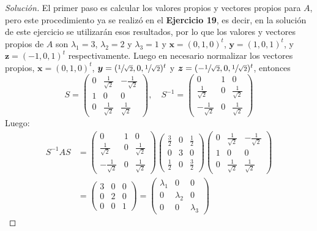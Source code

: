 \documentclass[12pt]{book}
\newenvironment{solucion}
  {\renewcommand\qedsymbol{$\square$}\begin{proof}[Solución]}
  {\end{proof}}
\begin{document}
\begin{solucion}
El primer paso es calcular los valores propios y vectores propios para $A$, pero este procedimiento ya se realizó en el \textbf{Ejercicio 19}, es decir, en la solución de este ejercicio se utilizarán esos resultados, por lo que los valores y vectores propios de $A$ son $\lambda_1=3$, $\lambda_2=2$ y $\lambda_3=1$ y $\bm{x}=(0,1,0)^t$, $\bm{y}=(1,0,1)^t$, y $\bm{z}=(-1,0,1)^t$ respectivamente. Luego en necesario normalizar los vectores propios, $\bm{x}=(0,1,0)^t$, $\bm{y}=(\sfrac{1}{\sqrt{2}},0,\sfrac{1}{\sqrt{2}})^t$ y $\bm{z}=(-\sfrac{1}{\sqrt{2}},0,\sfrac{1}{\sqrt{2}})^t$, entonces
    \[
        S=\begin{pmatrix}
            0 & \frac{1}{\sqrt{2}} & -\frac{1}{\sqrt{2}} \\
            1 & 0 & 0 \\
            0 & \frac{1}{\sqrt{2}} & \frac{1}{\sqrt{2}}
        \end{pmatrix},\quad S^{-1}=\begin{pmatrix}
            0 & 1 & 0 \\
            \frac{1}{\sqrt{2}} & 0 & \frac{1}{\sqrt{2}} \\
            -\frac{1}{\sqrt{2}} & 0 & \frac{1}{\sqrt{2}}
        \end{pmatrix}
    \]
Luego:
    \begin{align*}
        S^{-1}AS&=\begin{pmatrix}
            0 & 1 & 0 \\
            \frac{1}{\sqrt{2}} & 0 & \frac{1}{\sqrt{2}} \\
            -\frac{1}{\sqrt{2}} & 0 & \frac{1}{\sqrt{2}}
        \end{pmatrix}\begin{pmatrix}
            \frac{3}{2} & 0 & \frac{1}{2}\\
            0 & 3 & 0 \\
            \frac{1}{2} & 0 & \frac{3}{2}
        \end{pmatrix}\begin{pmatrix}
            0 & \frac{1}{\sqrt{2}} & -\frac{1}{\sqrt{2}} \\
            1 & 0 & 0 \\
            0 & \frac{1}{\sqrt{2}} & \frac{1}{\sqrt{2}}
        \end{pmatrix}\\
        &=\begin{pmatrix}
            3 & 0 & 0 \\
            0 & 2 & 0 \\
            0 & 0 & 1
        \end{pmatrix}=\begin{pmatrix}
            \lambda_1 & 0 & 0 \\
            0 & \lambda_2 & 0 \\
            0 & 0 & \lambda_3
        \end{pmatrix}
    \end{align*}  
 

\end{solucion}
\end{document}
